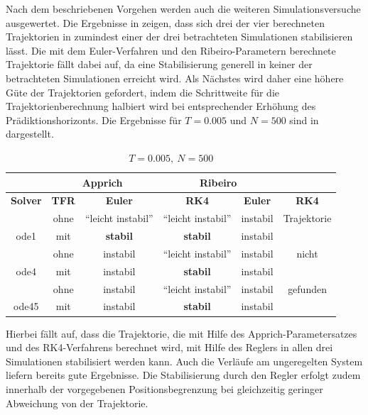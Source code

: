 Nach dem beschriebenen Vorgehen werden auch die weiteren Simulationsversuche ausgewertet. Die Ergebnisse in  zeigen, dass sich drei der vier berechneten Trajektorien in zumindest einer der drei betrachteten Simulationen stabilisieren lässt. Die mit dem Euler-Verfahren und den Ribeiro-Parametern berechnete Trajektorie fällt dabei auf, da eine Stabilisierung generell in keiner der betrachteten Simulationen erreicht wird. Als Nächstes wird daher eine höhere Güte der Trajektorien gefordert, indem die Schrittweite für die Trajektorienberechnung halbiert wird bei entsprechender Erhöhung des Prädiktionshorizonts. Die Ergebnisse für $T=0.005$ und $N=500$ sind in  dargestellt.
\begin{table}[H]
	\centering
	\caption{$T=0.005, \ N=500$}
		\begin{tabular}{c|c|c|c|c|c}
			\rowcolor[gray]{0.9}
			\multicolumn{2}{c|}{\textbf{Simulation}} & \multicolumn{2}{c|}{\textbf{Apprich}} & \multicolumn{2}{c}{\textbf{Ribeiro}} \\
			\midrule
			\rowcolor[gray]{0.9}
			\textbf{Solver} & \textbf{TFR} & \textbf{Euler} & \textbf{RK4} & \textbf{Euler} & \textbf{RK4} \\
			\midrule
			\cellcolor[gray]{0.9}  											& \cellcolor[gray]{.9}ohne & "`leicht instabil"'  & "`leicht instabil"' & instabil & Trajektorie\\
			\multirow{-2}{*}{\cellcolor[gray]{.9}ode1}	& \cellcolor[gray]{.9}mit  & \textbf{stabil} & \textbf{stabil} 			& instabil 				 & 	\\
			\midrule
			\cellcolor[gray]{0.9}  											& \cellcolor[gray]{.9}ohne & instabil	& "`leicht instabil"' & instabil & nicht\\
			\multirow{-2}{*}{\cellcolor[gray]{.9}ode4}	& \cellcolor[gray]{.9}mit  & instabil & \textbf{stabil} & instabil & \\
			\midrule	
			\cellcolor[gray]{0.9}  											& \cellcolor[gray]{.9}ohne & instabil	&  "`leicht instabil"' & instabil 	& gefunden\\
			\multirow{-2}{*}{\cellcolor[gray]{.9}ode45}	& \cellcolor[gray]{.9}mit  & instabil	&  \textbf{stabil}  & instabil 	& \																											
		\end{tabular}
	\label{tab:T0005N500Fmax400}
\end{table}

Hierbei fällt auf, dass die Trajektorie, die mit Hilfe des Apprich-Parametersatzes und des RK4-Verfahrens berechnet wird, mit Hilfe des Reglers in allen drei Simulationen stabilisiert werden kann. Auch die Verläufe am ungeregelten System liefern bereits gute Ergebnisse. Die Stabilisierung durch den Regler erfolgt zudem innerhalb der vorgegebenen Positionsbegrenzung bei gleichzeitig geringer Abweichung von der Trajektorie.




